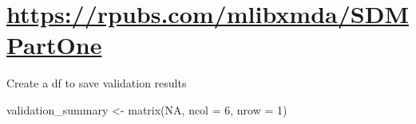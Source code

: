 \documentclass[
]{book}
\newenvironment{Shaded}{\begin{snugshade}}{\end{snugshade}}
\newcommand{\AttributeTok}[1]{\textcolor[rgb]{0.77,0.63,0.00}{#1}}
\newcommand{\ConstantTok}[1]{\textcolor[rgb]{0.00,0.00,0.00}{#1}}
\newcommand{\DecValTok}[1]{\textcolor[rgb]{0.00,0.00,0.81}{#1}}
\newcommand{\FunctionTok}[1]{\textcolor[rgb]{0.00,0.00,0.00}{#1}}
\newcommand{\NormalTok}[1]{#1}
\newcommand{\OtherTok}[1]{\textcolor[rgb]{0.56,0.35,0.01}{#1}}
\begin{document}
\hypertarget{httpsrpubs.commlibxmdasdmpartone}{%
\chapter{\texorpdfstring{\url{https://rpubs.com/mlibxmda/SDMPartOne}}{https://rpubs.com/mlibxmda/SDMPartOne}}\label{httpsrpubs.commlibxmdasdmpartone}}

Create a df to save validation results

\begin{Shaded}
\begin{Highlighting}[]
\NormalTok{validation\_summary }\OtherTok{\textless{}{-}} \FunctionTok{matrix}\NormalTok{(}\ConstantTok{NA}\NormalTok{, }\AttributeTok{ncol =} \DecValTok{6}\NormalTok{, }\AttributeTok{nrow =} \DecValTok{1}\NormalTok{)}
\end{Highlighting}
\end{Shaded}
\end{document}
